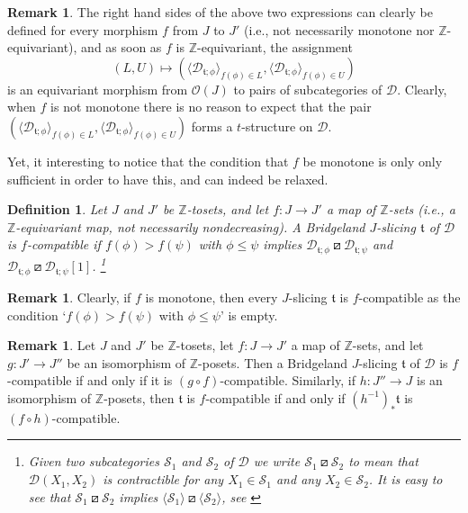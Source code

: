 \documentclass{article}
\newtheorem{defn}[thm]{Definition}
\theoremstyle{definition}
\newtheorem{rem}[thm]{Remark}
\newcommand{\Z}{\mathbb{Z}}
\newcommand{\tee}{\mathfrak{t}}
\newcommand{\orth}{\boxslash}
\begin{document}
\begin{rem}
The right hand sides of the above two expressions can clearly be defined for every morphism $f$ from $J$ to $J'$ (i.e., not necessarily monotone nor $\Z$-equivariant), and as soon as $f$ is $\Z$-equivariant, the assignment
\[
(L,U)\mapsto (\langle \mathscr{D}_{\tee;\phi}\rangle_{f(\phi)\in L},\langle \mathscr{D}_{\tee;\phi}\rangle_{f(\phi)\in U})
\]
is an equivariant morphism from $\mathcal{O}(J)$ to pairs of subcategories of $\mathscr{D}$. Clearly, when $f$ is not monotone there is no reason to expect that the pair $(\langle \mathscr{D}_{\tee;\phi}\rangle_{f(\phi)\in L},\langle \mathscr{D}_{\tee;\phi}\rangle_{f(\phi)\in U})$ forms a $t$-structure on $\mathscr{D}$.
\end{rem}
Yet, it interesting to notice that the condition that $f$ be monotone is only only sufficient in order to have this, and can indeed be relaxed.\\




\begin{defn}\label{compatible}
Let $J$ and $J'$ be $\Z$-tosets, and let $f\colon J\to J'$ a map of $\Z$-sets (i.e., a $\Z$-equivariant map, not necessarily nondecreasing). A Bridgeland $J$-slicing $\tee$ of $\mathscr{D}$ is \emph{$f$-compatible}
if $f(\phi)>f(\psi)$ with $\phi\leq \psi$ implies $\mathscr{D}_{\tee; \phi}\orth \mathscr{D}_{\tee;\psi}$ and $\mathscr{D}_{\tee; \phi}\orth \mathscr{D}_{\tee;\psi}[1]$.
\footnote{Given two subcategories $\mathscr{S}_1$ and $\mathscr{S}_2$ of $\mathscr{D}$ we write $\mathscr{S}_1\orth \mathscr{S}_2$ to mean that $\mathscr{D}(X_1,X_2)$ is contractible for any $X_1\in \mathscr{S}_1$ and any $X_2\in\mathscr{S}_2$. It is easy to see that $\mathscr{S}_1\orth \mathscr{S}_2$ implies $\langle\mathscr{S}_1\rangle\orth \langle\mathscr{S}_2\rangle$, see \cite[Lemma 4.21]{fosco}}
\end{defn}

\begin{rem}\label{everything-compatible}
Clearly, if $f$ is monotone, then every $J$-slicing $\tee$ is $f$-compatible as the condition `$f(\phi)>f(\psi)$ with $\phi\leq \psi$' is empty.
\end{rem}

\begin{rem}\label{avanti-e-indietro}
Let $J$ and $J'$ be $\Z$-tosets, let $f\colon J\to J'$ a map of $\Z$-sets, and let $g\colon J'\to J''$ be an isomorphism of $\Z$-posets. Then a Bridgeland $J$-slicing $\tee$ of $\mathscr{D}$ is $f$-compatible if and only if it is $(g\circ f)$-compatible. Similarly, if $h\colon J''\to J$ is an isomorphism of $\Z$-posets, then $\tee$ is $f$-compatible if and only if $(h^{-1})_*\tee$ is $(f\circ h)$-compatible.
\end{rem}
\end{document}
